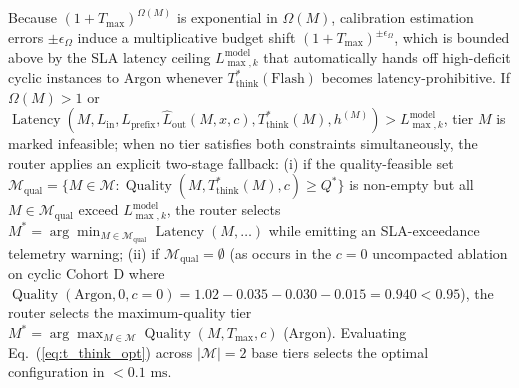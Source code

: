\documentclass[conference,10pt]{IEEEtran}
\begin{document}
Because $(1 + T_{\max})^{\Omega(M)}$ is exponential in $\Omega(M)$, calibration estimation errors $\pm \epsilon_{\Omega}$ induce a multiplicative budget shift $(1 + T_{\max})^{\pm \epsilon_{\Omega}}$, which is bounded above by the SLA latency ceiling $L_{\max,k}^{\text{model}}$ that automatically hands off high-deficit cyclic instances to Argon whenever $T_{\text{think}}^*(\text{Flash})$ becomes latency-prohibitive. If $\Omega(M) > 1$ or $\operatorname{Latency}(M, L_{\text{in}}, L_{\text{prefix}}, \hat{L}_{\text{out}}(M, x, c), T_{\text{think}}^*(M), h^{(M)}) > L_{\max,k}^{\text{model}}$, tier $M$ is marked infeasible; when no tier satisfies both constraints simultaneously, the router applies an explicit two-stage fallback: (i) if the quality-feasible set $\mathcal{M}_{\text{qual}} = \{M \in \mathcal{M} : \operatorname{Quality}(M, T_{\text{think}}^*(M), c) \ge Q^*\}$ is non-empty but all $M \in \mathcal{M}_{\text{qual}}$ exceed $L_{\max,k}^{\text{model}}$, the router selects $M^* = \arg\min_{M \in \mathcal{M}_{\text{qual}}} \operatorname{Latency}(M, \dots)$ while emitting an SLA-exceedance telemetry warning; (ii) if $\mathcal{M}_{\text{qual}} = \emptyset$ (as occurs in the $c=0$ uncompacted ablation on cyclic Cohort D where $\operatorname{Quality}(\text{Argon}, 0, c=0) = 1.02 - 0.035 - 0.030 - 0.015 = 0.940 < 0.95$), the router selects the maximum-quality tier $M^* = \arg\max_{M \in \mathcal{M}} \operatorname{Quality}(M, T_{\max}, c)$ (Argon). Evaluating Eq.~(\ref{eq:t_think_opt}) across $|\mathcal{M}| = 2$ base tiers selects the optimal configuration in $< 0.1\text{ ms}$.
\end{document}
